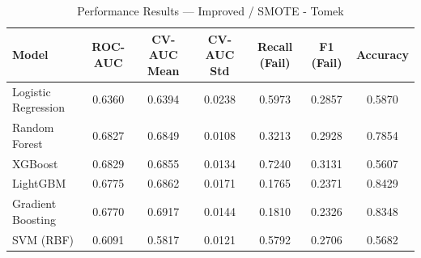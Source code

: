 \begin{table}[htbp]
\caption{Performance Results — Improved / SMOTE - Tomek}
\label{tab:improved_smote_-_tomek}
\begin{tabular}{lcccccc}
\toprule

Model & ROC-AUC & CV-AUC Mean & CV-AUC Std & Recall (Fail) & F1 (Fail) & Accuracy \\
\midrule

Logistic Regression & 0.6360 & 0.6394 & 0.0238 & 0.5973 & 0.2857 & 0.5870 \\
Random Forest & 0.6827 & 0.6849 & 0.0108 & 0.3213 & 0.2928 & 0.7854 \\
XGBoost & 0.6829 & 0.6855 & 0.0134 & 0.7240 & 0.3131 & 0.5607 \\
LightGBM & 0.6775 & 0.6862 & 0.0171 & 0.1765 & 0.2371 & 0.8429 \\
Gradient Boosting & 0.6770 & 0.6917 & 0.0144 & 0.1810 & 0.2326 & 0.8348 \\
SVM (RBF) & 0.6091 & 0.5817 & 0.0121 & 0.5792 & 0.2706 & 0.5682 \\
\bottomrule

\end{tabular}
\end{table}

